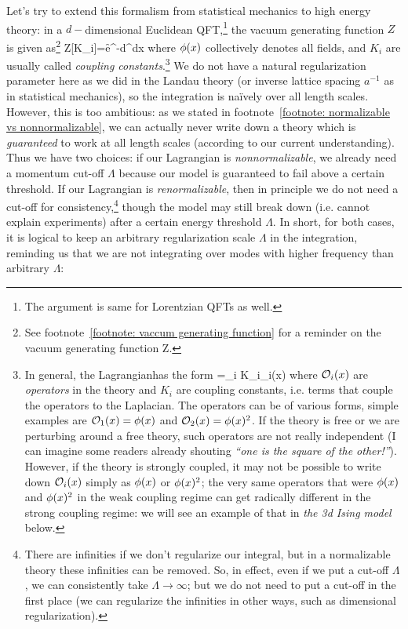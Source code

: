 \documentclass[12pt]{article}
\numberwithin{equation}{section}
\def\naively{naïvely }
\begin{document}
Let's try to extend this formalism from statistical mechanics to high energy theory: in a $d-$dimensional Euclidean QFT,\footnote{The argument is same for Lorentzian QFTs as well.} the vacuum generating function $Z$ is given as\footnote{See footnote~\ref{footnote: vaccum generating function} for a reminder on the vacuum generating function Z.} 
\be 
Z[K_i]=\int \cD \f e^{-\int d^dx\cL[K_i,\f(x)]}
\ee 
where $\phi(x)$ collectively denotes all fields, and $K_i$ are usually called \emph{coupling constants}.\footnote{In general, the Lagrangian\footnotemark has the form
\be 
\label{eq: most general form of Lagrangian}
\cL[K_i,\f(x)]=\sum_i K_i\cO_i(x)
\ee 
where $\mathcal{O}_i(x)$ are \emph{operators} in the theory and $K_i$ are coupling constants, i.e. terms that couple the operators to the Laplacian. The operators can be of various forms, simple examples are $\mathcal{O}_1(x)=\phi(x)$ and $\mathcal{O}_2(x)=\phi(x)^2$. If the theory is free or we are perturbing around a free theory, such operators are not really independent (I can imagine some readers already shouting \emph{``one is the square of the other!''}). However, if the theory is strongly coupled, it may not be possible to write down $\mathcal{O}_i(x)$ simply as $\phi(x)$ or $\phi(x)^2$; the very same operators that were $\phi(x)$ and $\phi(x)^2$ in the weak coupling regime can get radically different in the strong coupling regime: we will see an example of that in \emph{the 3d Ising model} below.
} We do not have a natural regularization parameter here as we did in the Landau theory (or inverse lattice spacing $a^{-1}$ as in statistical mechanics), so the integration is \naively over all length scales. However, this is too ambitious: as we stated in footnote~\ref{footnote: normalizable vs nonnormalizable}, we can actually never write down a theory which is \emph{guaranteed} to work at all length scales (according to our current understanding). Thus we have two choices: if our Lagrangian is \emph{nonnormalizable}, we already need a momentum cut-off $\Lambda$ because our model is guaranteed to fail above a certain threshold. If our Lagrangian is \emph{renormalizable}, then in principle we do not need a cut-off for consistency,\footnote{There are infinities if we don't regularize our integral, but in a normalizable theory these infinities can be removed. So, in effect, even if we put a cut-off $\Lambda$, we can consistently take $\Lambda\rightarrow\infty$; but we do not need to put a cut-off in the first place (we can regularize the infinities in other ways, such as dimensional regularization).} though the model may still break down (i.e. cannot explain experiments) after a certain energy threshold $\Lambda$. In short, for both cases, it is logical to keep an arbitrary regularization scale $\Lambda$ in the integration, reminding us that we are not integrating over modes  with higher frequency than arbitrary $\Lambda$:
\end{document}
